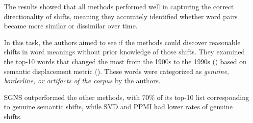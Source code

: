 The results showed that all methods performed well in capturing the correct directionality of shifts, meaning they accurately identified whether word pairs became more similar or dissimilar over time.

In this task, the authors aimed to see if the methods could discover reasonable shifts in word meanings without prior knowledge of those shifts.
They examined the top-10 words that changed the most from the 1900s to the 1990s () based on semantic displacement metric ().
These words were categorized as \emph{genuine, borderline, or artifacts of the corpus} by the authors.

SGNS outperformed the other methods, with 70\% of its top-10 list corresponding to genuine semantic shifts, while SVD and PPMI had lower rates of genuine shifts.

